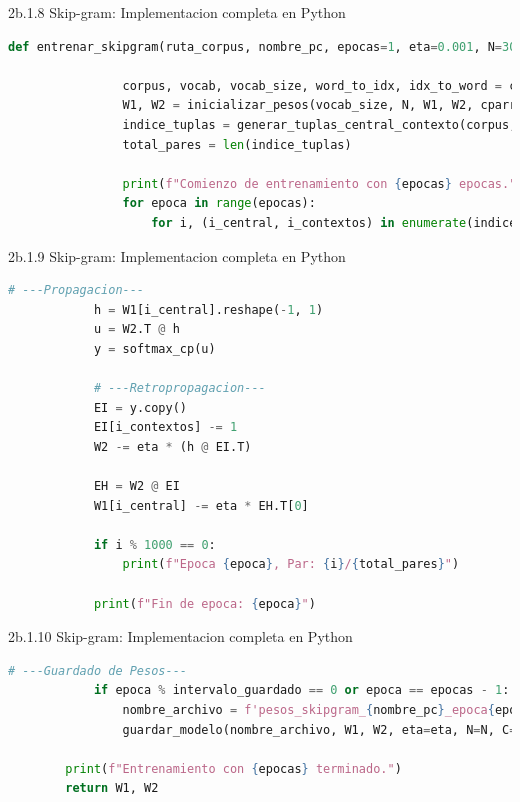 \documentclass{beamer}
\begin{document}
\begin{frame}[fragile]{2b.1.8 Skip-gram: Implementacion completa en Python}
	
	\begin{block}{}
		\begin{lstlisting}[language=Python]
			def entrenar_skipgram(ruta_corpus, nombre_pc, epocas=1, eta=0.001, N=300, C=4, W1=None, W2=None, intervalo_guardado=50):
			
				corpus, vocab, vocab_size, word_to_idx, idx_to_word = cargar_corpus(ruta_corpus)
				W1, W2 = inicializar_pesos(vocab_size, N, W1, W2, cparray=True)
				indice_tuplas = generar_tuplas_central_contexto(corpus, word_to_idx, C)
				total_pares = len(indice_tuplas)
				
				print(f"Comienzo de entrenamiento con {epocas} epocas.")
				for epoca in range(epocas):
					for i, (i_central, i_contextos) in enumerate(indice_tuplas):              
		\end{lstlisting}
	\end{block}
\end{frame}

\begin{frame}[fragile]{2b.1.9 Skip-gram: Implementacion completa en Python}
	
	\begin{block}{}
		\begin{lstlisting}[language=Python]
			# ---Propagacion---
			h = W1[i_central].reshape(-1, 1)
			u = W2.T @ h
			y = softmax_cp(u)
			
			# ---Retropropagacion---
			EI = y.copy()
			EI[i_contextos] -= 1
			W2 -= eta * (h @ EI.T)
			
			EH = W2 @ EI
			W1[i_central] -= eta * EH.T[0]
			
			if i % 1000 == 0:
				print(f"Epoca {epoca}, Par: {i}/{total_pares}")
			
			print(f"Fin de epoca: {epoca}")                
		\end{lstlisting}
	\end{block}
\end{frame}

\begin{frame}[fragile]{2b.1.10 Skip-gram: Implementacion completa en Python}
	
	\begin{block}{}
		\begin{lstlisting}[language=Python]
			# ---Guardado de Pesos---
			if epoca % intervalo_guardado == 0 or epoca == epocas - 1:
				nombre_archivo = f'pesos_skipgram_{nombre_pc}_epoca{epoca}.npz'
				guardar_modelo(nombre_archivo, W1, W2, eta=eta, N=N, C=C, cparray=True)
			
		print(f"Entrenamiento con {epocas} terminado.")
		return W1, W2                
		\end{lstlisting}
	\end{block}
\end{frame}
\end{document}
